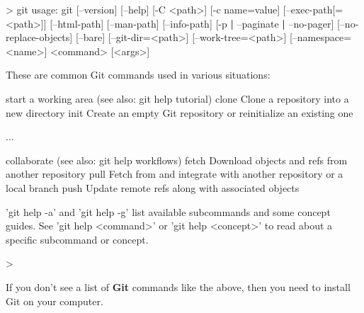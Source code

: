 \documentclass[a4paperpaper,openright]{book}
\newenvironment{Shaded}{}{}
\newcommand{\BuiltInTok}[1]{#1}
\newcommand{\ExtensionTok}[1]{#1}
\newcommand{\FunctionTok}[1]{\textcolor[rgb]{0.02,0.16,0.49}{#1}}
\newcommand{\KeywordTok}[1]{\textcolor[rgb]{0.00,0.44,0.13}{\textbf{#1}}}
\newcommand{\NormalTok}[1]{#1}
\newcommand{\OperatorTok}[1]{\textcolor[rgb]{0.40,0.40,0.40}{#1}}
\newcommand{\StringTok}[1]{\textcolor[rgb]{0.25,0.44,0.63}{#1}}
\begin{document}
\begin{Shaded}
\begin{Highlighting}[]
    \OperatorTok{>} \FunctionTok{git}
    \ExtensionTok{usage}\NormalTok{: git [--version] [--help] [-C }\OperatorTok{<}\NormalTok{path}\OperatorTok{>}\NormalTok{] [-c name=value]}
\NormalTok{               [}\ExtensionTok{--exec-path}\NormalTok{[=}\OperatorTok{<}\NormalTok{path}\OperatorTok{>}\NormalTok{]] [--html-path] [--man-path] [--info-path]}
\NormalTok{               [}\ExtensionTok{-p} \KeywordTok{|} \ExtensionTok{--paginate} \KeywordTok{|} \ExtensionTok{--no-pager}\NormalTok{] [--no-replace-objects] [--bare]}
\NormalTok{               [}\ExtensionTok{--git-dir}\NormalTok{=}\OperatorTok{<}\NormalTok{path}\OperatorTok{>}\NormalTok{] [--work-tree=}\OperatorTok{<}\NormalTok{path}\OperatorTok{>}\NormalTok{] [--namespace=}\OperatorTok{<}\NormalTok{name}\OperatorTok{>}\NormalTok{]}
               \OperatorTok{<}\BuiltInTok{command}\OperatorTok{>}\NormalTok{ [}\OperatorTok{<}\NormalTok{args}\OperatorTok{>}\NormalTok{]}

    \ExtensionTok{These}\NormalTok{ are common Git commands used in various situations:}

    \ExtensionTok{start}\NormalTok{ a working area (see also: git help tutorial)}
       \ExtensionTok{clone}\NormalTok{      Clone a repository into a new directory}
       \ExtensionTok{init}\NormalTok{       Create an empty Git repository or reinitialize an existing one}

    \ExtensionTok{...}

    \ExtensionTok{collaborate}\NormalTok{ (see also: git help workflows)}
       \ExtensionTok{fetch}\NormalTok{      Download objects and refs from another repository}
       \ExtensionTok{pull}\NormalTok{       Fetch from and integrate with another repository or a local branch}
       \ExtensionTok{push}\NormalTok{       Update remote refs along with associated objects}

    \StringTok{'git help -a'} \ExtensionTok{and} \StringTok{'git help -g'}\NormalTok{ list available subcommands and some}
    \ExtensionTok{concept}\NormalTok{ guides. See }\StringTok{'git help <command>'}\NormalTok{ or }\StringTok{'git help <concept>'}
    \ExtensionTok{to}\NormalTok{ read about a specific subcommand or concept.}

    \OperatorTok{>}
\end{Highlighting}
\end{Shaded}

If you don't see a list of \textbf{Git} commands like the above, then
you need to install Git on your computer.
\end{document}

